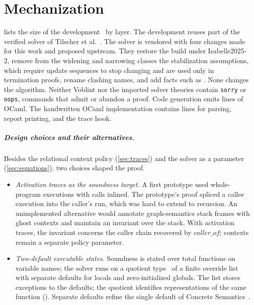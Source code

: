\section{Mechanization}
\label{sec:mechanization}

 lists the size of the development~\cite{voblint} by layer. The development reuses part of the verified
solver of Tilscher et al.~\cite{tilscher26}. The solver is vendored with four
changes made for this work and proposed upstream. They restore the build
under Isabelle2025-2, remove from the widening and narrowing classes the
stabilization assumptions, which require update sequences to stop changing
and are used only in termination proofs, rename clashing
names, and add facts such as . None changes the
algorithm.
Neither Voblint nor the imported solver theories contain \texttt{sorry} or
\texttt{oops}, commands that admit or abandon a proof. Code generation emits  lines of OCaml. The handwritten
OCaml implementation contains  lines for parsing,
report printing, and the trace hook.

\begin{table}[t]
\centering
\scriptsize

\caption{Size of the development by layer: lines of Isabelle/HOL including
comments, and proved statements, which are \texttt{lemma}, \texttt{theorem}
and \texttt{corollary} commands. The counts exclude one theory generated from
the grammar manifest (\texttt{VIMP\_Grammar\_Generated}).}
\label{tab:scale}
\end{table}

\subparagraph*{Design choices and their alternatives.}
Besides the relational context policy (\cref{sec:traces}) and the solver
as a parameter (\cref{sec:equations}), two choices shaped the proof.
\begin{itemize}
  \item \emph{Activation traces as the soundness target.} A first prototype
    used whole-program executions with calls inlined. The prototype's proof spliced
    a callee execution into the caller's run, which was hard to extend to
    recursion. An unimplemented alternative would annotate graph-semantics
    stack frames with ghost contexts and maintain an invariant over the stack.
    With activation traces, the invariant concerns the caller chain recovered
    by $\mathit{caller\_of}$; contexts remain a separate policy parameter.
  \item \emph{Two-default executable states.} Soundness is stated over total
    functions on variable names; the solver runs on a quotient
    type~\cite{huffman13} of a finite override list with separate defaults
    for locals and zero-initialized globals. The list stores exceptions to
    the defaults; the quotient identifies representations of the same function
    (). Separate defaults refine the single
    default of Concrete Semantics~\cite[§13.6]{nipkow14}.
\end{itemize}

